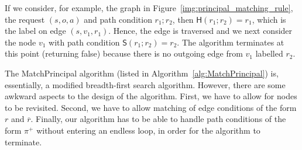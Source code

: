 \documentclass{article}
\newcommand{\hd}[1]{\mathsf{H}(#1)}
\newcommand{\tl}[1]{\mathsf{S}(#1)}
\newcommand{\comp}{\mathbin{;}}
\begin{document}
If we consider, for example, the graph in Figure~\ref{img:principal_matching_rule}, the request $(s,o,a)$ and path condition $r_1 \comp r_2$, then $\hd{r_1 \comp r_2} = r_1$, which is the label on edge $(s,v_1,r_1)$.
Hence, the edge is traversed and we next consider the node $v_1$ with path condition $\tl{r_1 \comp r_2} = r_2$.
The algorithm terminates at this point (returning false) because there is no outgoing edge from $v_1$ labelled $r_2$.

The \textsf{MatchPrincipal} algorithm (listed in Algorithm~\ref{alg:MatchPrincipal}) is, essentially, a modified breadth-first search algorithm.
However, there are some awkward aspects to the design of the algorithm.
First, we have to allow for nodes to be revisited.
Second, we have to allow matching of edge conditions of the form $r$ and $\overline{r}$.
Finally, our algorithm has to be able to handle path conditions of the form $\pi^+$ without entering an endless loop, in order for the algorithm to terminate.
\end{document}
